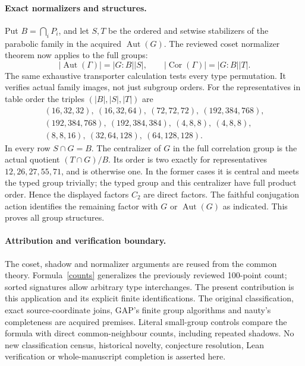 \documentclass[11pt]{article}
\newcommand{\Aut}{\operatorname{Aut}}\newcommand{\Cor}{\operatorname{Cor}}
\begin{document}
\paragraph{Exact normalizers and structures.}
Put $B=\bigcap_iP_i$, and let $S,T$ be the ordered and setwise
stabilizers of the parabolic family in the acquired $\Aut(G)$.
The reviewed coset normalizer theorem now applies to the full groups:
\[
 |\Aut(\Gamma)|=|G:B||S|,\qquad
 |\Cor(\Gamma)|=|G:B||T|.
\]
The same exhaustive transporter calculation tests every type permutation.
It verifies actual family images, not just subgroup orders.
For the representatives in table order the triples $(|B|,|S|,|T|)$ are
\[
\begin{gathered}
(16,32,32),\ (16,32,64),\ (72,72,72),\ (192,384,768),\\
(192,384,768),\ (192,384,384),\ (4,8,8),\ (4,8,8),\\
(8,8,16),\ (32,64,128),\ (64,128,128).
\end{gathered}
\]
In every row $S\cap G=B$. The centralizer of $G$ in the full
correlation group is the actual quotient $(T\cap G)/B$. Its order
is two exactly for representatives $12,26,27,55,71$, and is otherwise
one. In the former cases it is central and meets the typed group
trivially; the typed group and this centralizer have full product
order. Hence the displayed factors $C_2$ are direct factors.
The faithful conjugation action identifies the remaining factor with
$G$ or $\Aut(G)$ as indicated. This proves all group structures.

\paragraph{Attribution and verification boundary.}
The coset, shadow and normalizer arguments are reused from the common
theory. Formula~\eqref{counts} generalizes the previously reviewed
100-point count; sorted signatures allow arbitrary type interchanges.
The present contribution is this application and its explicit finite
identifications. The original classification, exact source-coordinate
joins, GAP's finite group algorithms and nauty's completeness are
acquired premises. Literal small-group controls compare the formula
with direct common-neighbour counts, including repeated shadows.
No new classification census, historical novelty, conjecture resolution,
Lean verification or whole-manuscript completion is asserted here.
\end{document}

